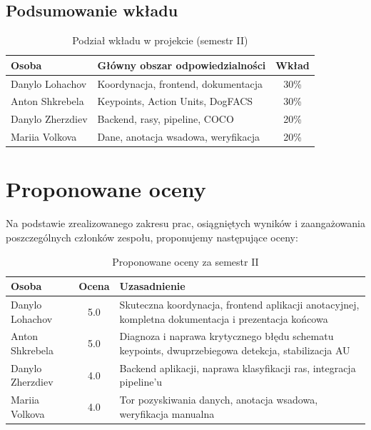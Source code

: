 \documentclass[11pt,a4paper]{article}
\begin{document}
\subsection{Podsumowanie wkładu}

\begin{table}[h!]
\centering
\begin{tabular}{l p{7.2cm} c}
\toprule
\textbf{Osoba} & \textbf{Główny obszar odpowiedzialności} & \textbf{Wkład} \\
\midrule
Danylo Lohachov  & Koordynacja, frontend, dokumentacja      & 30\% \\
Anton Shkrebela  & Keypoints, Action Units, DogFACS         & 30\% \\
Danylo Zherzdiev & Backend, rasy, pipeline, COCO            & 20\% \\
Mariia Volkova   & Dane, anotacja wsadowa, weryfikacja      & 20\% \\
\bottomrule
\end{tabular}
\caption{Podział wkładu w projekcie (semestr II)}
\end{table}

\section{Proponowane oceny}

Na podstawie zrealizowanego zakresu prac, osiągniętych wyników i zaangażowania
poszczególnych członków zespołu, proponujemy następujące oceny:

\begin{table}[h!]
\centering
\begin{tabular}{l c p{8cm}}
\toprule
\textbf{Osoba} & \textbf{Ocena} & \textbf{Uzasadnienie} \\
\midrule
Danylo Lohachov  & 5.0 & Skuteczna koordynacja, frontend aplikacji anotacyjnej,
                         kompletna dokumentacja i prezentacja końcowa \\[0.5em]
Anton Shkrebela  & 5.0 & Diagnoza i naprawa krytycznego błędu schematu keypoints,
                         dwuprzebiegowa detekcja, stabilizacja AU \\[0.5em]
Danylo Zherzdiev & 4.0 & Backend aplikacji, naprawa klasyfikacji ras,
                         integracja pipeline'u \\[0.5em]
Mariia Volkova   & 4.0 & Tor pozyskiwania danych, anotacja wsadowa,
                         weryfikacja manualna \\
\bottomrule
\end{tabular}
\caption{Proponowane oceny za semestr II}
\end{table}
\end{document}
